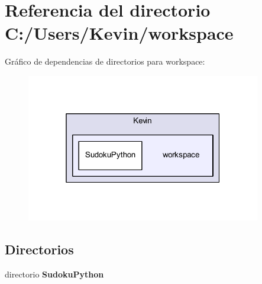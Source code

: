 \section{Referencia del directorio C\-:/\-Users/\-Kevin/workspace}
\label{dir_608ef091639dac304f74443f1e51763d}
Gráfico de dependencias de directorios para workspace\-:\nopagebreak
\begin{figure}[H]
\begin{center}
\leavevmode
\includegraphics[width=290pt]{dir_608ef091639dac304f74443f1e51763d_dep}
\end{center}
\end{figure}
\subsection*{Directorios}
\begin{DoxyCompactItemize}
\item 
directorio {\bf Sudoku\-Python}
\end{DoxyCompactItemize}
